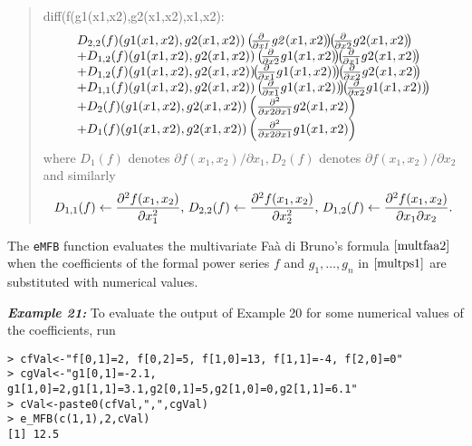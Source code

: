 \begin{quote}
diff(f(g1(x1,x2),g2(x1,x2),x1,x2):
\[
\begin{array}{l}
D_{{2,2}}(f)(g1(x1,x2), g2(x1,x2))  \left(\!{\frac {\partial }{\partial {\it x1}}}{\it g2}(x1,x2)\!\right)\!\! \left(\!{\frac {\partial }{\partial x2}} g2(x1,x2)\!\right) \\ + D_{{1,2}}(f)(g1(x1,x2),g2(x1,x2)) \left(\!{\frac {\partial }{\partial x2}}g1(x1,x2)\!\right)\!\! 
\left(\!{\frac {\partial }{\partial x1}}g2(x1,x2)\!\right) \\
+ D_{1,2}(f)(g1(x1,x2),g2(x1,x2)) \!\! 
\left(\!{\frac {\partial }{\partial x1}}g1(x1,x2))\!\right) \!\!
\left(\!{\frac {\partial }{\partial x2}}g2(x1,x2)\!\right) \\
+ D_{{1,1}}(f)(g1(x1,x2), g2(x1,x2))
\left(\! {\frac {\partial}{\partial x1}}g1(x1,x2))\!\right)\!\!
\left(\!{\frac {\partial }{\partial x2}}g1(x1,x2))\!\right) \\
+ D_{{2}}(f)(g1(x1,x2), g2(x1,x2)) 
\left({\frac {\partial^{2}}{\partial x2 \partial x1}}g2(x1,x2)\right)\\
+ D_{{1}}(f)(g1(x1,x2),g2(x1,x2)) \left({\frac {\partial^{2}}{\partial x2 \partial x1}} g1(x1,x2)\right)
\end{array}\]
where \(D_{1}(f)\) denotes \(\partial f(x_1,x_2)/\partial x_1, D_{2}(f)\) denotes
\(\partial f(x_1,x_2)/\partial x_2\) and similarly
\[{\small D_{1,1}(f) \leftarrow  \frac{\partial^2 f(x_1,x_2)}{\partial x_1^2}, \, D_{2,2}(f) \leftarrow  \frac{\partial^2 f(x_1,x_2)}{\partial x_2^2}, \, D_{1,2}(f) \leftarrow \frac{\partial^2 f(x_1,x_2)}{\partial x_1 \partial x_2}}.\]
\end{quote}

The \texttt{eMFB} function evaluates the multivariate Faà di Bruno's formula \(\eqref{multfaa2}\) when the coefficients of the formal power series \(f\) and \(g_1, \ldots, g_n\) in \(\eqref{multps1}\) are substituted with numerical values.

\hskip-0.5cm\textbf{\emph{Example 21:}} To evaluate the output of Example 20 for some numerical values of the coefficients, run

\begin{verbatim}
> cfVal<-"f[0,1]=2, f[0,2]=5, f[1,0]=13, f[1,1]=-4, f[2,0]=0"
> cgVal<-"g1[0,1]=-2.1, g1[1,0]=2,g1[1,1]=3.1,g2[0,1]=5,g2[1,0]=0,g2[1,1]=6.1"
> cVal<-paste0(cfVal,",",cgVal)
> e_MFB(c(1,1),2,cVal)
[1] 12.5
\end{verbatim}


